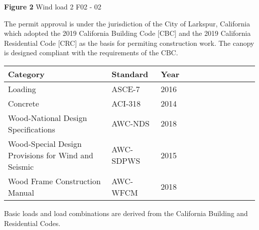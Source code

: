 \documentclass[12pt,notitle,letterpaper]{report}
\begin{document}
\textbf{Figure 2} Wind load 2 \hfill F02 - 02

The permit approval is under the jurisdiction of the City of Larkspur,
California which adopted the 2019 California Building Code {[}CBC{]} and the
2019 California Residential Code {[}CRC{]} as the basis for permiting
construction work. The canopy is designed compliant with the
requirements of the CBC.

 \begin{tabulary}{1.0\textwidth}{leftleftleft}
\hline
 Category                                            & Standard   &   Year \\
\hline
 Loading                                             & ASCE-7     &   2016 \\
 Concrete                                            & ACI-318    &   2014 \\
 Wood-National Design Specifications                 & AWC-NDS    &   2018 \\
 Wood-Special Design Provisions for Wind and Seismic & AWC-SDPWS  &   2015 \\
 Wood Frame Construction Manual                      & AWC-WFCM   &   2018 \\
\hline
\end{tabulary}
\vspace{.15in}

Basic loads and load combinations are derived from the California Building
and Residential Codes.
\end{document}
